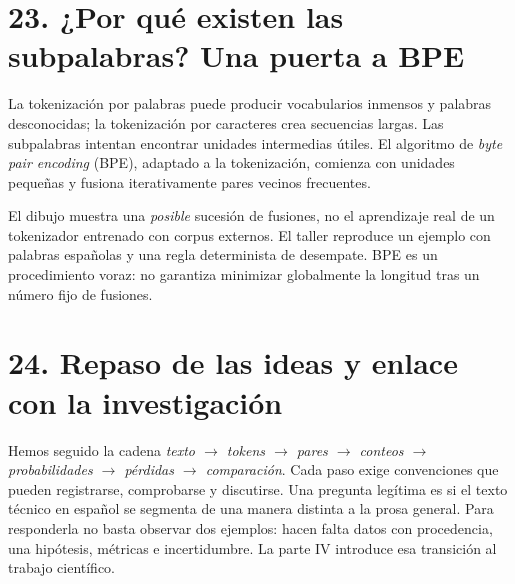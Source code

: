 \section*{23. ¿Por qué existen las subpalabras? Una puerta a BPE}
La tokenización por palabras puede producir vocabularios inmensos y palabras desconocidas; la tokenización por caracteres crea secuencias largas. Las subpalabras intentan encontrar unidades intermedias útiles. El algoritmo de \emph{byte pair encoding} (BPE), adaptado a la tokenización, comienza con unidades pequeñas y fusiona iterativamente pares vecinos frecuentes.
\begin{center}
\end{center}
El dibujo muestra una \emph{posible} sucesión de fusiones, no el aprendizaje real de un tokenizador entrenado con corpus externos. El taller reproduce un ejemplo con palabras españolas y una regla determinista de desempate. BPE es un procedimiento voraz: no garantiza minimizar globalmente la longitud tras un número fijo de fusiones.

\section*{24. Repaso de las ideas y enlace con la investigación}
Hemos seguido la cadena \emph{texto $\to$ tokens $\to$ pares $\to$ conteos $\to$ probabilidades $\to$ pérdidas $\to$ comparación}. Cada paso exige convenciones que pueden registrarse, comprobarse y discutirse. Una pregunta legítima es si el texto técnico en español se segmenta de una manera distinta a la prosa general. Para responderla no basta observar dos ejemplos: hacen falta datos con procedencia, una hipótesis, métricas e incertidumbre. La parte IV introduce esa transición al trabajo científico.
\clearpage

